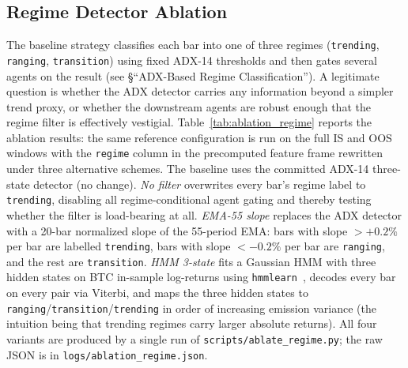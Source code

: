 \documentclass{article}
\begin{document}
\subsection{Regime Detector Ablation}
\label{sec:regime_ablation}

The baseline strategy classifies each bar into one of three regimes (\texttt{trending}, \texttt{ranging}, \texttt{transition}) using fixed ADX-14 thresholds and then gates several agents on the result (see \S``ADX-Based Regime Classification'').
A legitimate question is whether the ADX detector carries any information beyond a simpler trend proxy, or whether the downstream agents are robust enough that the regime filter is effectively vestigial.
Table~\ref{tab:ablation_regime} reports the ablation results: the same reference configuration is run on the full IS and OOS windows with the \texttt{regime} column in the precomputed feature frame rewritten under three alternative schemes.
The baseline uses the committed ADX-14 three-state detector (no change).
\emph{No filter} overwrites every bar's regime label to \texttt{trending}, disabling all regime-conditional agent gating and thereby testing whether the filter is load-bearing at all.
\emph{EMA-55 slope} replaces the ADX detector with a 20-bar normalized slope of the 55-period EMA: bars with slope $> +0.2\%$ per bar are labelled \texttt{trending}, bars with slope $< -0.2\%$ per bar are \texttt{ranging}, and the rest are \texttt{transition}.
\emph{HMM 3-state} fits a Gaussian HMM with three hidden states on BTC in-sample log-returns using \texttt{hmmlearn}~\citep{LopezDePrado2018}, decodes every bar on every pair via Viterbi, and maps the three hidden states to \texttt{ranging}/\texttt{transition}/\texttt{trending} in order of increasing emission variance (the intuition being that trending regimes carry larger absolute returns).
All four variants are produced by a single run of \texttt{scripts/ablate\_regime.py}; the raw JSON is in \texttt{logs/ablation\_regime.json}.
\end{document}
